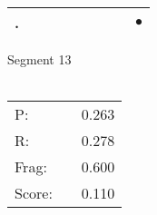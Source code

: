 \documentclass[landscape]{article}
\newcommand{\ssp}{\hspace{2pt}}
\newcommand{\mex}{\cellcolor{g}$\bullet$}
\begin{document}
\begin{tabular}{|l|p{10pt}|p{10pt}|p{10pt}|p{10pt}|p{10pt}|p{10pt}|p{10pt}|p{10pt}|}
\hline
\ssp \cellcolor{ref7}. \ssp&\hspace{2pt}&\hspace{2pt}&\hspace{2pt}&\hspace{2pt}&\hspace{2pt}&\hspace{2pt}&\hspace{2pt}&\hspace{2pt}\mex\\
\hline
\end{tabular}

\vspace{6pt}
\noindent Segment 13\\\\
\noindent\begin{tabular}{lm{12pt}r}
\hline
P:&&0.263\\
R:&&0.278\\
Frag:&&0.600\\
Score:&&0.110\\
\end{tabular}

\newpage
\end{document}
